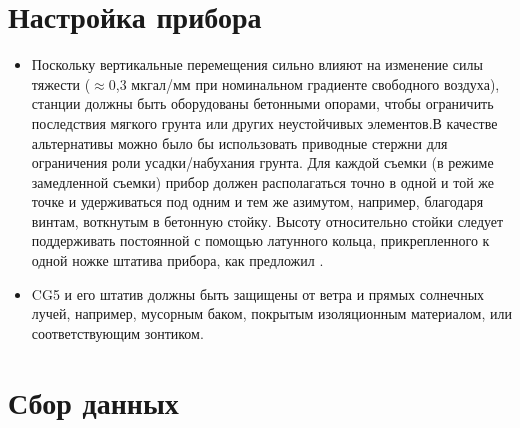\section[Настройка прибора]{Настройка прибора}
\label{sec:setting_up_the_instrument}

\begin{itemize}
    \item Поскольку вертикальные перемещения сильно влияют на изменение силы
    тяжести ($\approx$0,3 мкгал/мм при номинальном градиенте свободного воздуха),
    станции должны быть оборудованы бетонными опорами, чтобы ограничить
    последствия мягкого грунта или других неустойчивых элементов.В качестве
    альтернативы можно было бы использовать приводные стержни для ограничения
    роли усадки/набухания грунта. Для каждой съемки (в режиме замедленной
    съемки) прибор должен располагаться точно в одной и той же точке и
    удерживаться под одним и тем же азимутом, например, благодаря винтам,
    воткнутым в бетонную стойку. Высоту относительно стойки следует поддерживать
    постоянной с помощью латунного кольца, прикрепленного к одной ножке штатива
    прибора, как предложил \cite{montgomery_1971}.
    
    \item CG5 и его штатив должны быть защищены от ветра и прямых солнечных
    лучей, например, мусорным баком, покрытым изоляционным материалом, или
    соответствующим зонтиком.
    
\end{itemize}

\section[Сбор данных]{Сбор данных}
\label{sec:data_acquisition}


